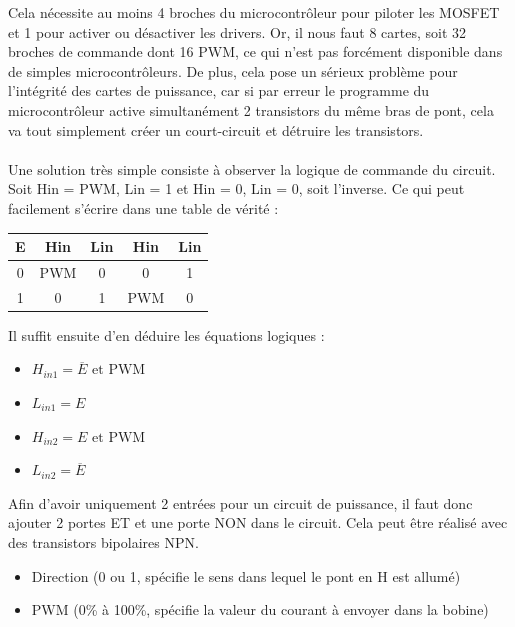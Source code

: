 \documentclass{article}
\begin{document}
\noindent Cela nécessite au moins 4 broches du microcontrôleur pour piloter les MOSFET et 1 pour activer ou désactiver les drivers. Or, il nous faut 8 cartes, soit 32 broches de commande dont 16 PWM, ce qui n'est pas forcément disponible dans de simples microcontrôleurs. De plus, cela pose un sérieux problème pour l'intégrité des cartes de puissance, car si par erreur le programme du microcontrôleur active simultanément 2 transistors du même bras de pont, cela va tout simplement créer un court-circuit et détruire les transistors.
\\\\
Une solution très simple consiste à observer la logique de commande du circuit. Soit Hin = PWM, Lin = 1 et Hin = 0, Lin = 0, soit l'inverse. Ce qui peut facilement s'écrire dans une table de vérité :
\begin{center}
    \begin{tabular}{|c|c|c|c|c|}
        \hline
        E & Hin\textunderscore 1 & Lin\textunderscore 1 & Hin\textunderscore 2 & Lin\textunderscore 2 \\
        \hline
        0 & PWM & 0 & 0 & 1 \\
        
        1 & 0 & 1 & PWM & 0 \\
        \hline \hline
    \end{tabular}
\end{center}
Il suffit ensuite d'en déduire les équations logiques :
\begin{itemize}
    \item $H_{in1} = \overline{E} \text{ et } \text{PWM}$
    \item $L_{in1} = E$
    \item $H_{in2} = E \text{ et } \text{PWM}$
    \item $L_{in2} = \overline{E}$
\end{itemize}
Afin d'avoir uniquement 2 entrées pour un circuit de puissance, il faut donc  ajouter 2 portes ET et une porte NON dans le circuit. Cela peut être réalisé avec des transistors bipolaires NPN.
\begin{itemize}
    \item Direction (0 ou 1, spécifie le sens dans lequel le pont en H est allumé)
    \item PWM (0\% à 100\%, spécifie la valeur du courant à envoyer dans la bobine)
\end{itemize}
\end{document}
